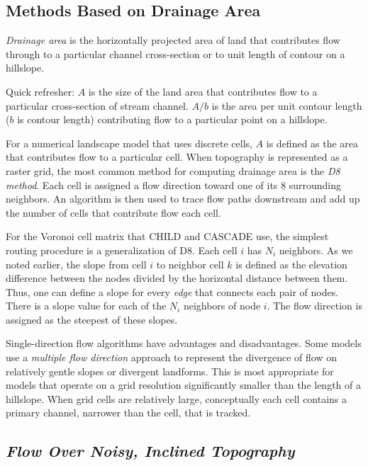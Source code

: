 \documentclass[12pt]{amsart}
\begin{document}
\subsection{Methods Based on Drainage Area}

{\em Drainage area} is the horizontally projected area of land that contributes flow through to a particular channel cross-section or to unit length of contour on a hillslope.

Quick refresher: $A$ is the size of the land area that contributes flow to a particular cross-section of stream channel. $A/b$ is the area per unit contour length ($b$ is contour length) contributing flow to a particular point on a hillslope.

For a numerical landscape model that uses discrete cells, $A$ is defined as the area that contributes flow to a particular cell. When topography is represented as a raster grid, the most common method for computing drainage area is the {\em D8 method}. Each cell is assigned a flow direction toward one of its 8 surrounding neighbors. An algorithm is then used to trace flow paths downstream and add up the number of cells that contribute flow each cell.

For the Voronoi cell matrix that CHILD and CASCADE use, the simplest routing procedure is a generalization of D8. Each cell $i$ has $N_i$ neighbors. As we noted earlier, the slope from cell $i$ to neighbor cell $k$ is defined as the elevation difference between the nodes divided by the horizontal distance between them. Thus, one can define a slope for every {\em edge} that connects each pair of nodes. There is a slope value for each of the $N_i$ neighbors of node $i$. The flow direction is assigned as the steepest of these slopes.

Single-direction flow algorithms have advantages and disadvantages. Some models use a {\em multiple flow direction} approach to represent the divergence of flow on relatively gentle slopes or divergent landforms. This is most appropriate for models that operate on a grid resolution significantly smaller than the length of a hillslope. When grid cells are relatively large, conceptually each cell contains a primary channel, narrower than the cell, that is tracked.

\bigskip
\subsection*{\em Flow Over Noisy, Inclined Topography}
\end{document}
